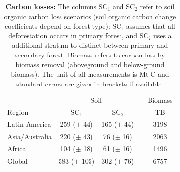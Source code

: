 		\begin{table}[ht]
			\centering
			\caption[Carbon losses]{\textbf{Carbon losses:} The columns SC$_1$ and SC$_2$ refer to soil organic carbon loss scenarios (soil organic carbon change coefficients depend on forest type): SC$_1$ assumes that all deforestation occurs in primary forest, and SC$_2$ uses a additional stratum to distinct between primary and secondary forest. Biomass refers to carbon loss by biomass removal (aboveground and below-ground biomass). The unit of all measurements is Mt C and standard errors are given in brackets if available.}
			\label{tab:soce_tab}
			\begin{tabular}{lccrc}
				\hline
				& \multicolumn{2}{c}{Soil} && Biomass \\\cline{2-3}\cline{5-5}
				Region & SC$_1$ & SC$_2$ && TB\\\hline
				Latin America & 259 ($\pm$ 44) & 165 ($\pm$ 44) && 3198\\
				Asia/Australia & 220 ($\pm$ 43) & 76 ($\pm$ 16) && 2063\\
				Africa & 104 ($\pm$ 18) & 61 ($\pm$ 16) && 1496\\
				Global & 583 ($\pm$ 105) & 302 ($\pm$ 76) && 6757\\\hline
			\end{tabular}
		\end{table}

